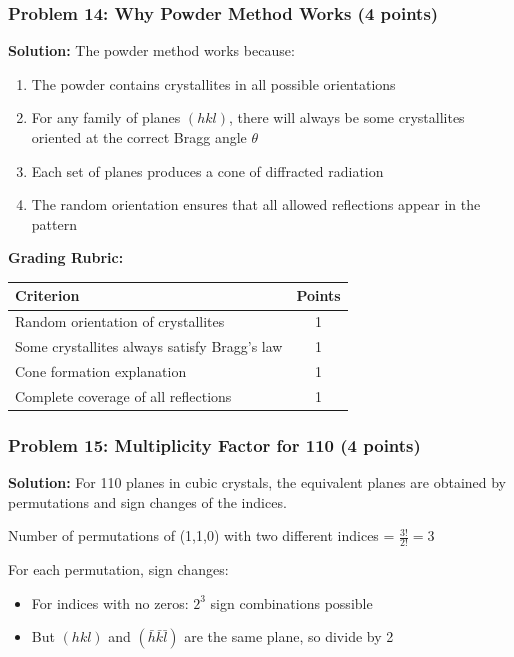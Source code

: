 \documentclass[12pt,a4paper]{article}
\begin{document}
\subsubsection*{Problem 14: Why Powder Method Works (4 points)}
\textbf{Solution:}
The powder method works because:
\begin{enumerate}
    \item The powder contains crystallites in all possible orientations
    \item For any family of planes $(hkl)$, there will always be some crystallites oriented at the correct Bragg angle $\theta$
    \item Each set of planes produces a cone of diffracted radiation
    \item The random orientation ensures that all allowed reflections appear in the pattern
\end{enumerate}

\textbf{Grading Rubric:}
\begin{table}[h]
\centering
\begin{tabular}{|p{10cm}|c|}
\hline
\textbf{Criterion} & \textbf{Points} \\
\hline
Random orientation of crystallites & 1 \\
Some crystallites always satisfy Bragg's law & 1 \\
Cone formation explanation & 1 \\
Complete coverage of all reflections & 1 \\
\hline
\end{tabular}
\end{table}

\subsubsection*{Problem 15: Multiplicity Factor for {110} (4 points)}
\textbf{Solution:}
For {110} planes in cubic crystals, the equivalent planes are obtained by permutations and sign changes of the indices.

Number of permutations of (1,1,0) with two different indices = $\frac{3!}{2!} = 3$

For each permutation, sign changes:
\begin{itemize}
    \item For indices with no zeros: $2^3$ sign combinations possible
    \item But $(hkl)$ and $(\bar{h}\bar{k}\bar{l})$ are the same plane, so divide by 2
\end{itemize}
\end{document}
